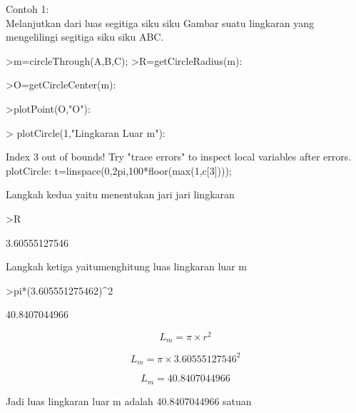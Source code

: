 \documentclass[a4paper,10pt]{article}
\begin{document}
\begin{eulernotebook}
\begin{eulercomment}
\begin{eulercomment}
\begin{eulercomment}
Contoh 1:\\
Melanjutkan dari luas segitiga siku siku Gambar suatu lingkaran yang
mengelilingi segitiga siku siku ABC.
\end{eulercomment}
\begin{eulerprompt}
>m=circleThrough(A,B,C);
>R=getCircleRadius(m):
\end{eulerprompt}
\begin{eulerprompt}
>O=getCircleCenter(m):
\end{eulerprompt}
\begin{eulerprompt}
>plotPoint(O,"O"):
\end{eulerprompt}
\begin{eulerprompt}
> plotCircle(1,"Lingkaran Luar m"):
\end{eulerprompt}
\begin{euleroutput}
  Index 3 out of bounds!
  Try "trace errors" to inspect local variables after errors.
  plotCircle:
      t=linspace(0,2pi,100*floor(max(1,c[3])));
\end{euleroutput}
\begin{eulercomment}
Langkah kedua yaitu menentukan jari jari lingkaran
\end{eulercomment}
\begin{eulerprompt}
>R
\end{eulerprompt}
\begin{euleroutput}
  3.60555127546
\end{euleroutput}
\begin{eulercomment}
Langkah ketiga yaitumenghitung luas lingkaran luar m
\end{eulercomment}
\begin{eulerprompt}
>pi*(3.605551275462)^2
\end{eulerprompt}
\begin{euleroutput}
  40.8407044966
\end{euleroutput}
\begin{eulerformula}
\[
L_{m}= \pi \times r^2
\]
\end{eulerformula}
\begin{eulerformula}
\[
L_{m}= \pi \times 3.60555127546^2
\]
\end{eulerformula}
\begin{eulerformula}
\[
L_{m}= 40.8407044966
\]
\end{eulerformula}
\begin{eulercomment}
Jadi luas lingkaran luar m adalah  40.8407044966 satuan


\end{eulercomment}
\end{eulercomment}
\end{eulercomment}
\end{eulernotebook}
\end{document}
